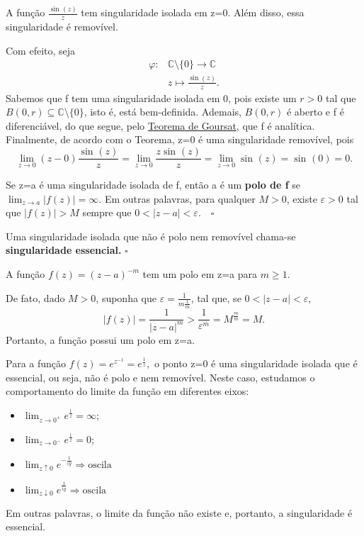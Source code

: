 \documentclass[complex.tex]{subfiles}
\begin{document}
\begin{example}
	A função \(\frac{\sin^{}{(z)}}{z}\) tem singularidade isolada em z=0. Além disso, essa singularidade é removível.

	Com efeito, seja
	\begin{align*}
		\varphi : & \mathbb{C}\setminus{\{0\}}\rightarrow \mathbb{C} \\
		          & z\mapsto \frac{\sin{(z)}}{z}.
	\end{align*}
	Sabemos que f tem uma singularidade isolada em 0, pois existe um \(r > 0\) tal que \(B(0, r)\subseteq \mathbb{C}\setminus{\{0\}}\), isto é, está bem-definida. Ademais, \(B(0, r)\) é aberto
	e f é diferenciável, do que segue, pelo \hyperlink{goursat}{Teorema de Goursat}, que f é analítica. Finalmente, de acordo com o Teorema, z=0 é uma singularidade removível, pois
	\[
		\lim_{z\to 0}(z-0)\frac{\sin^{}{(z)}}{z} = \lim_{z\to 0}\frac{z\sin^{}{(z)}}{z} = \lim_{z\to 0}\sin^{}{(z)} = \sin^{}{(0)} = 0.
	\]
\end{example}
\begin{def*}
	Se z=a é uma singularidade isolada de f, então a é um \textbf{polo de f} se \(\lim_{z\to a}|f(z)| = \infty.\) Em outras palavras,
	para qualquer \(M > 0\), existe \(\varepsilon > 0\) tal que \(|f(z)| > M\) sempre que \(0 < |z-a| < \varepsilon .\quad \square\)
\end{def*}
\begin{def*}
	Uma singularidade isolada que não é polo nem removível chama-se \textbf{singularidade essencial.} \(\square\)
\end{def*}
\begin{example}
	A função \(f(z) = (z-a)^{-m}\) tem um polo em z=a para \(m\geq 1\).

	De fato, dado \(M > 0\), suponha que \(\varepsilon  = \frac{1}{m \frac{1}{m}}\), tal que, se \(0 < |z-a| < \varepsilon ,\)
	\[
		|f(z)| = \frac{1}{|z-a|^{m}}> \frac{1}{\varepsilon ^{m}} = M^{\frac{m}{m}} = M.
	\]
	Portanto, a função possui um polo em z=a.
\end{example}
\begin{example}
	Para a função \(f(z) = e^{z^{-1}} = e^{\frac{1}{z}},\) o ponto z=0 é uma singularidade isolada que é essencial, ou seja, não é polo e nem removível. Neste caso, estudamos o comportamento do limite
	da função em diferentes eixos:
	\begin{itemize}
		\item \(\lim_{z\to 0^{+}}e^{\frac{1}{z}} = \infty\);
		\item \(\lim_{z\to 0^{-}}e^{\frac{1}{z}} = 0\);
		\item \(\lim_{z \uparrow 0}e^{-\frac{1}{iy}} \Rightarrow \text{oscila}\)
		\item \(\lim_{z \downarrow 0}e^{\frac{1}{iy}} \Rightarrow \text{oscila}\)
	\end{itemize}
	Em outras palavras, o limite da função não existe e, portanto, a singularidade é essencial.
\end{example}
\end{document}
